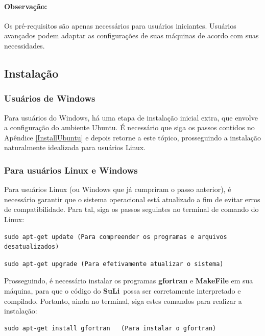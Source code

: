 \documentclass[12pt, a4paper]{article}
\newcommand{\SL}{{\bf SuLi}}
\begin{document}
\paragraph{Observação:} Os pré-requisitos são apenas necessários para usuários iniciantes. Usuários avançados podem adaptar as configurações de suas máquinas de acordo com suas necessidades.

\subsection{Instalação}
\subsubsection{Usuários de Windows}	\label{WindowsUsers}
Para usuários do Windows, há uma etapa de instalação inicial extra, que envolve a configuração do ambiente Ubuntu. É necessário que siga os passos contidos no Apêndice \ref{InstallUbuntu} e depois retorne a este tópico, prosseguindo a instalação naturalmente idealizada para usuários Linux.

\subsubsection{Para usuários Linux e Windows}  \label{ContinueInstall}
Para usuários Linux (ou Windows que já cumpriram o passo anterior), é necessário garantir que o sistema operacional está atualizado a fim de evitar erros de compatibilidade. Para tal, siga os passos seguintes no terminal de comando do Linux:

\begin{verbatim}
sudo apt-get update (Para compreender os programas e arquivos desatualizados)
\end{verbatim}

\begin{verbatim}
sudo apt-get upgrade (Para efetivamente atualizar o sistema)
\end{verbatim}

Prosseguindo, é necessário instalar os programas {\bf gfortran} e {\bf MakeFile} em sua máquina, para que o código do \SL\ possa ser corretamente interpretado e compilado. Portanto, ainda no terminal, siga estes comandos para realizar a instalação:

\begin{verbatim}
sudo apt-get install gfortran	(Para instalar o gfortran)
\end{verbatim}
\end{document}
